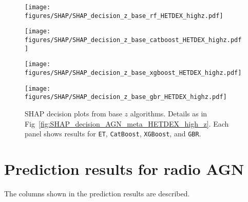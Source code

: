 \documentclass{aa}
\begin{document}
\begin{appendix}
\begin{figure}
  \centering
  \begin{minipage}{0.49\columnwidth}
    \centering
    \texttt{[image: figures/SHAP/SHAP\_decision\_z\_base\_rf\_HETDEX\_highz.pdf]}
  \end{minipage}%
  \hfill
  \begin{minipage}{0.49\columnwidth}
    \centering
    \texttt{[image: figures/SHAP/SHAP\_decision\_z\_base\_catboost\_HETDEX\_highz.pdf]}
  \end{minipage}\break%
  \begin{minipage}{0.49\columnwidth}
    \centering
    \texttt{[image: figures/SHAP/SHAP\_decision\_z\_base\_xgboost\_HETDEX\_highz.pdf]}
  \end{minipage}%
  \hfill
  \begin{minipage}{0.49\columnwidth}
    \centering
    \texttt{[image: figures/SHAP/SHAP\_decision\_z\_base\_gbr\_HETDEX\_highz.pdf]}
  \end{minipage}
  \caption{SHAP decision plots from base $z$ algorithms. Details as in Fig~\ref{fig:SHAP_decision_AGN_meta_HETDEX_high_z}. Each panel shows results for \texttt{ET}, \texttt{CatBoost}, \texttt{XGBoost}, and \texttt{GBR}.}
  \label{fig:SHAP_decision_z_base_HETDEX_high_z}
\end{figure}

\section{Prediction results for radio AGN}\label{sec:app_prediction_results}

The columns shown in the prediction results are described.

\begin{itemize}


\end{itemize}
\end{appendix}
\end{document}
